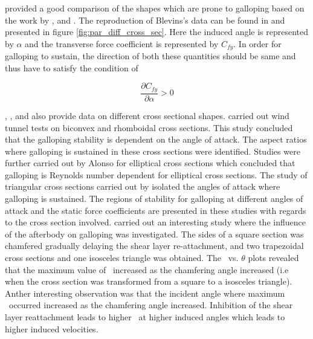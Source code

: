 \citet{Blevins1990} provided a good comparison of the shapes which are prone to galloping based on the work by \citet{Parkinson1961}, \citet{Nakamura1975a} and \citet{Nakamura1977}. The reproduction of Blevins's data can be found in \citet{Paidoussis2010} and presented in figure \ref{fig:par_diff_cross_sec}. Here the induced angle is represented by $\alpha$ and the transverse force coefficient is represented by $C_{fy}$. In order for galloping to sustain, the direction of both these quantities should be same and thus have to satisfy the condition of 

\begin{equation}
\frac{\partial C_{fy}}{\partial \alpha } >0
\end{equation}  
    
 
 
 
\citet{Naudascher1993}, \citet{Ruscheweyh1996}, \citet{Deniz1997} and \citet{Weaver2005} also provide data on different cross sectional shapes. \citet{Alonso2009} carried out wind tunnel tests on biconvex and rhomboidal cross sections. This study concluded that the galloping stability is dependent on the angle of attack. The aspect ratios where galloping is sustained in these cross sections were identified. Studies were further carried out by Alonso for elliptical cross sections \citep{Alonso2010} which concluded that galloping is Reynolds number dependent for elliptical cross sections. The study of triangular cross sections carried out by \citep{Alonso2005} isolated the angles of attack where galloping is sustained. The regions of stability for galloping at different angles of attack and the static force coefficients are presented in these studies with regards to the cross section involved. \citet{Luo1994} carried out an interesting study where the influence of the afterbody on galloping was investigated. The sides of a square section was chamfered gradually delaying the shear layer re-attachment, and two trapezoidal cross sections and one isosceles triangle was obtained. The \cy\ vs. $\theta$ plots revealed that the maximum value of \cy\ increased as the chamfering angle increased (i.e when the cross section was transformed from a square to a isosceles triangle). Anther interesting observation was that the incident angle where maximum \cy\ occurred increased as the chamfering angle increased. Inhibition of the shear layer reattachment leads to higher \cy\ at higher induced angles which leads to higher induced velocities. 

